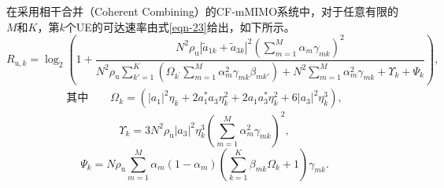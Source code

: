 \begin{theorem}
在采用相干合并（Coherent Combining）的CF‑mMIMO系统中，对于任意有限的$M$和$K$，第$k$个UE的可达速率由式\eqref{eqn-23}给出，如下所示。
\begin{equation}\label{eqn-23}
		R_{\text{u}, k}=\log _{2}\left(1+\frac{N^{2} \rho_\text{u}\left|\tilde{a}_{1 k}+\tilde{a}_{3 k}\right|^{2}\left(\sum\limits_{m=1}^{M} \alpha_{m} \gamma_{m k}\right)^{2}}{N^{2} \rho_\text{u} \sum\limits_{k'=1}^{K}\left(\Omega_{k^{\prime}} \sum\limits_{m=1}^{M} \alpha_{m}^{2} \gamma_{m k} \beta_{m k'}\right)+N^{2} \sum\limits_{m=1}^{M} \alpha_{m}^{2} \gamma_{m k}+\Upsilon _k+\Psi _k }\right),
\end{equation}
\begin{equation}\label{eqn-omega}\begin{aligned}\text{其中}\quad\quad \Omega _k = \left( {{{\left| {{a_1}} \right|}^2}{\eta _{k}} + 2a_1^*{a_3}{\eta _{k}^2}+ 2{a_1}a_3^ * \eta _{k}^2 + 6{{\left| {{a_3}} \right|}^2}\eta _{k}^3} \right), \end{aligned}\end{equation}
\begin{equation}\Upsilon _k=3 N^{2} \rho_\text{u}\left|a_{3}\right|^{2} \eta_{k}^{3}\left(\sum\limits_{m=1}^{M} \alpha_{m}^{2} \gamma_{m k}\right)^{2},\end{equation}
\begin{equation}\Psi _k={N}{\rho _\text{u}}\mathop \sum \limits_{m = 1}^M {\alpha _m}(1 - {\alpha _m})\left( {\mathop \sum \limits_{k = 1}^K {\beta _{mk}}\Omega _k + 1} \right){\gamma _{mk}}.
\end{equation}
\end{theorem}
